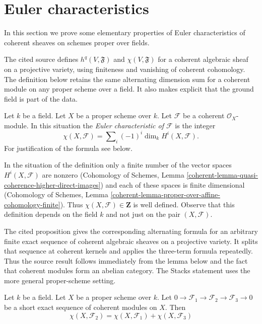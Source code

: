 \section{Euler characteristics}
\label{section-euler}

\noindent
In this section we prove some elementary properties of Euler characteristics
of coherent sheaves on schemes proper over fields.

\begin{definition}
\label{definition-euler-characteristic}
\begin{reference}
\cite[Chapter III, \S 6, no. 79, definition of the
Euler--Poincar\'e characteristic, pp. 274--275]{FAC}
\end{reference}
\begin{history}
The cited source defines $h^q(V, \mathfrak F)$ and
$\chi(V, \mathfrak F)$ for a coherent algebraic sheaf on a projective
variety, using finiteness and vanishing of coherent cohomology. The
definition below retains the same alternating dimension sum for a coherent
module on any proper scheme over a field. It also makes explicit that the
ground field is part of the data.
\end{history}
Let $k$ be a field. Let $X$ be a proper scheme over $k$. Let $\mathcal{F}$
be a coherent $\mathcal{O}_X$-module. In this situation the
{\it Euler characteristic of $\mathcal{F}$} is the integer
$$
\chi(X, \mathcal{F}) = \sum\nolimits_i (-1)^i \dim_k H^i(X, \mathcal{F}).
$$
For justification of the formula see below.
\end{definition}

\noindent
In the situation of the definition only a finite number of the vector spaces
$H^i(X, \mathcal{F})$ are nonzero (Cohomology of Schemes, Lemma
\ref{coherent-lemma-quasi-coherence-higher-direct-images})
and each of these spaces is finite dimensional
(Cohomology of Schemes, Lemma
\ref{coherent-lemma-proper-over-affine-cohomology-finite}). Thus
$\chi(X, \mathcal{F}) \in \mathbf{Z}$ is well defined. Observe that
this definition depends on the field $k$ and not just on the pair
$(X, \mathcal{F})$.

\begin{lemma}
\label{lemma-euler-characteristic-additive}
\begin{reference}
\cite[Chapter III, \S 6, no. 79, Proposition 2, p. 275]{FAC}
\end{reference}
\begin{history}
The cited proposition gives the corresponding alternating formula for an
arbitrary finite exact sequence of coherent algebraic sheaves on a projective
variety. It splits that sequence at coherent kernels and applies the
three-term formula repeatedly. Thus the source result follows immediately
from the lemma below and the fact that coherent modules form an abelian
category. The Stacks statement uses the more general proper-scheme setting.
\end{history}
Let $k$ be a field. Let $X$ be a proper scheme over $k$.
Let $0 \to \mathcal{F}_1 \to \mathcal{F}_2 \to \mathcal{F}_3 \to 0$
be a short exact sequence of coherent modules on $X$. Then
$$
\chi(X, \mathcal{F}_2) = \chi(X, \mathcal{F}_1) + \chi(X, \mathcal{F}_3)
$$
\end{lemma}

